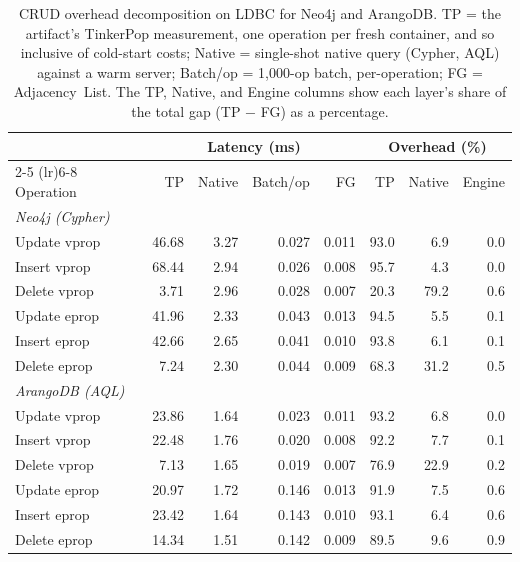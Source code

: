 \begin{table}[t]
  \centering
  \setlength{\tabcolsep}{2pt}
  \begin{tabular*}{\columnwidth}{@{\extracolsep{\fill}}l rrrr rrr@{}}
    \toprule
    & \multicolumn{4}{c}{Latency (ms)} & \multicolumn{3}{c}{Overhead (\%)} \\
    \cmidrule(lr){2-5} \cmidrule(lr){6-8}
      Operation & TP & Native & Batch/op & FG & TP & Native & Engine \\
    \midrule
    \multicolumn{8}{l}{\textit{Neo4j (Cypher)}} \\
    Update vprop & 46.68 & 3.27 & 0.027 & 0.011 & 93.0 & 6.9 & 0.0 \\
    Insert vprop & 68.44 & 2.94 & 0.026 & 0.008 & 95.7 & 4.3 & 0.0 \\
    Delete vprop &  3.71 & 2.96 & 0.028 & 0.007 & 20.3 & 79.2 & 0.6 \\
    Update eprop & 41.96 & 2.33 & 0.043 & 0.013 & 94.5 & 5.5 & 0.1 \\
    Insert eprop & 42.66 & 2.65 & 0.041 & 0.010 & 93.8 & 6.1 & 0.1 \\
    Delete eprop &  7.24 & 2.30 & 0.044 & 0.009 & 68.3 & 31.2 & 0.5 \\
    \midrule
    \multicolumn{8}{l}{\textit{ArangoDB (AQL)}} \\
    Update vprop & 23.86 & 1.64 & 0.023 & 0.011 & 93.2 & 6.8 & 0.0 \\
    Insert vprop & 22.48 & 1.76 & 0.020 & 0.008 & 92.2 & 7.7 & 0.1 \\
    Delete vprop &  7.13 & 1.65 & 0.019 & 0.007 & 76.9 & 22.9 & 0.2 \\
    Update eprop & 20.97 & 1.72 & 0.146 & 0.013 & 91.9 & 7.5 & 0.6 \\
    Insert eprop & 23.42 & 1.64 & 0.143 & 0.010 & 93.1 & 6.4 & 0.6 \\
    Delete eprop & 14.34 & 1.51 & 0.142 & 0.009 & 89.5 & 9.6 & 0.9 \\
    \bottomrule
  \end{tabular*}
  \caption{CRUD overhead decomposition on LDBC for Neo4j and ArangoDB.
    TP = the artifact's TinkerPop measurement, one operation per fresh container, and so inclusive of cold-start costs; Native = single-shot native query (Cypher, AQL) against a warm server; Batch/op = 1{,}000-op batch, per-operation; FG = \project{} Adjacency~List.
    The TP, Native, and Engine columns show each layer's share of the total gap (TP $-$ FG) as a percentage.}
  \label{tab:crud-overhead}
\end{table}
